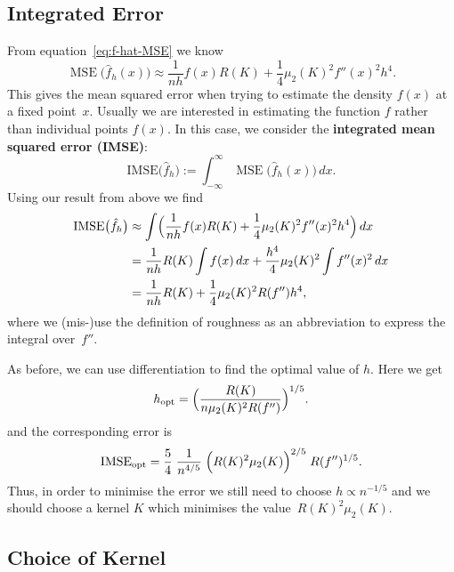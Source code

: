 \documentclass[
  a4paper,
]{article}
\theoremstyle{definition}
\theoremstyle{definition}
\theoremstyle{definition}
\theoremstyle{definition}
\theoremstyle{remark}
\begin{document}
\subsection{Integrated Error}\label{IMSE}

From equation~\eqref{eq:f-hat-MSE} we know
\begin{equation*}
  \mathop{\mathrm{MSE}}\nolimits\bigl( \hat f_h(x) \bigr)
  \approx \frac{1}{nh} f(x) R(K) + \frac14 \mu_2(K)^2 f''(x)^2 h^4.
\end{equation*}
This gives the mean squared error when trying to estimate the density
\(f(x)\) at a fixed point~\(x\). Usually we are interested in estimating
the function \(f\) rather than individual points \(f(x)\). In this case,
we consider the \textbf{integrated mean squared error (IMSE)}:
\begin{equation*}
  \mathrm{IMSE}\bigl( \hat f_h \bigr)
  := \int_{-\infty}^\infty \mathop{\mathrm{MSE}}\nolimits\bigl( \hat f_h(x) \bigr) \,dx.
\end{equation*}
Using our result from above we find
\begin{align*}
  \mathrm{IMSE}\bigl( \hat f_h \bigr)
  &\approx \int \Bigl( \frac{1}{nh} f(x) R(K) + \frac14 \mu_2(K)^2 f''(x)^2 h^4 \Bigr) \,dx \\
  &= \frac{1}{nh} R(K) \int f(x) \,dx + \frac{h^4}{4} \mu_2(K)^2 \int f''(x)^2 \,dx \\
  &= \frac{1}{nh} R(K) + \frac{1}{4} \mu_2(K)^2 R(f'') h^4,
\end{align*}
where we (mis-)use the definition of roughness as an abbreviation to express
the integral over~\(f''\).

As before, we can use differentiation to find the optimal value of \(h\).
Here we get
\begin{equation*}
  h_\mathrm{opt}
  = \Bigl( \frac{R(K)}{n \mu_2(K)^2 R(f'')} \Bigr)^{1/5}.
\end{equation*}
and the corresponding error is
\begin{equation}
  \mathrm{IMSE}_\mathrm{opt}
  = \frac54 \; \frac{1}{n^{4/5}}
      \; \Bigl( R(K)^2 \mu_2(K) \Bigr)^{2/5}
      \; R(f'')^{1/5}.  \label{eq:IMSE-opt}
\end{equation}
Thus, in order to minimise the error we still need to choose
\(h \propto n^{-1/5}\) and we should choose a kernel \(K\) which minimises
the value~\(R(K)^2 \mu_2(K)\).

\subsection{Choice of Kernel}\label{choice-of-kernel}
\end{document}
